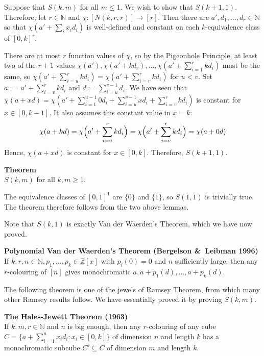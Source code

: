 \documentclass[a4paper]{article}
\let\oldendproof\endproof
\renewenvironment{proof}[1][\proofname]{%
  \oldproof[\scshape \noindent {\bfseries \text{Proof}}]%
}{\oldendproof}
\newenvironment{thm}[1]{
	\begin{framed}
	\noindent
	{\bfseries #1}\\}{
	\end{framed}
}
\newcommand{\ZZ}{\mathbb{Z}}
\begin{document}
\begin{proof}
Suppose that $S(k,m)$ for all $m \leq 1$.
We wish to show that $S(k+1,1)$.
Therefore, let $r \in \mathbb{N}$ and $\chi : [N(k,r,r)] \to [r]$.
Then there are $a', d_1, \ldots, d_r \in \mathbb{N}$ so that
$\chi(a' + \sum_i x_i d_i)$ is well-defined and constant on
each $k$-equivalence class of $[0,k]^r$.

There are at most $r$ function values of $\chi$,
so by the Pigeonhole Principle,
at least two of the $r+1$ values $\chi(a'), \chi(a' + kd_r), \ldots, \chi(a' + \sum_{i=1}^r kd_i)$
must be the same, so $\chi(a' + \sum_{i=u}^r kd_i) = \chi(a' + \sum_{i=v}^r kd_i)$ for $u < v$.
Set $a: = a' + \sum_{i=v}^r kd_i$ and $d:= \sum_{i=u}^{v-1} d_i$.
We have seen that
$\chi(a + xd) = \chi(a' + \sum_{i=1}^{u-1} 0 d_i + \sum_{i=u}^{v-1} xd_i + \sum_{i=v}^r kd_i)$
is constant for $x \in [0,k-1]$.
It also assumes this constant value in $x=k$:\vspace*{-1mm}
\[
	\chi(a+kd)
  = \chi\Bigl(a' + \sum_{i=u}^r kd_i\Bigr)
  = \chi\Bigl(a' + \sum_{i=v}^r kd_i\Bigr)
  = \chi(a + 0d)
\]
Hence, $\chi(a + xd)$ is constant for $x \in [0,k]$.
Therefore, $S(k+1, 1)$.
\end{proof}

\begin{thm}{Theorem}
$S(k,m)$ for all $k,m \geq 1$.
\end{thm}

\begin{proof}
The equivalence classes of $[0,1]^1$ are $\{0\}$ and $\{1\}$, so $S(1,1)$ is trivially true.
The theorem therefore follows from the two above lemmas.
\end{proof}

Note that $S(k,1)$ is exactly Van der Waerden's Theorem, which we have now proved.

\begin{thm}{Polynomial Van der Waerden's Theorem (Bergelson \&\ Leibman 1996)}
If $k,r,n \in \mathbb{N}, p_1, \ldots, p_k \in \ZZ[x]$ with $p_i (0) = 0$
and $n$ sufficiently large, then any $r$-colouring of $[n]$ gives
monochromatic $a, a+ p_1 (d), \ldots, a + p_k (d)$.
\end{thm}

The following theorem is one of the jewels of Ramsey Theorem,
from which many other Ramsey results follow.
We have essentially proved it by proving $S(k,m)$.

\begin{thm}{The Hales-Jewett Theorem (1963)}
If $k,m,r \in \mathbb{N}$ and $n$ is big enough,
then any $r$-colouring of any cube
$C = \{ a+ \sum_{i=1}^n x_i d_i : x_i \in [0,k]\}$ of dimension $n$
and length $k$ has a monochromatic subcube $C' \subseteq C$ of dimension $m$ and length $k$.
\end{thm}
\end{document}
